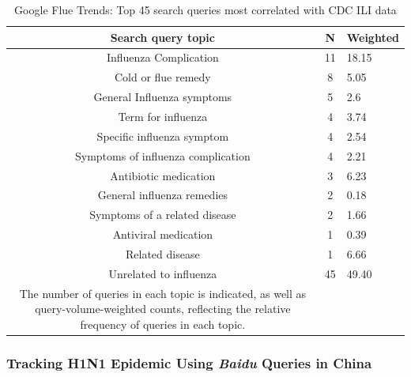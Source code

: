 \documentclass[sigconf]{acmart}
\begin{document}
\begin{table}
  \caption{Google Flue Trends: Top 45 search queries most correlated with CDC ILI data \cite{ginsburg09}}
  \label{tab:columns}
  \begin{tabular}{ccl}
    \toprule
     Search query topic& N& Weighted\\
    \midrule
     Influenza Complication& 11& 18.15\\
     Cold or flue remedy& 8& 5.05\\
     General Influenza symptoms& 5& 2.6\\
     Term for influenza& 4& 3.74\\
     Specific influenza symptom& 4& 2.54\\
     Symptoms of influenza complication& 4& 2.21\\
     Antibiotic medication& 3& 6.23\\
     General influenza remedies& 2& 0.18\\
     Symptoms of a related disease& 2& 1.66\\
     Antiviral medication& 1& 0.39\\
     Related disease& 1& 6.66\\
     Unrelated to influenza& 45& 49.40\\
    \midrule
     The number of queries in each topic is indicated, as well as query-volume-weighted counts, 
 reflecting the relative frequency of queries in each topic.\\ 
  \bottomrule
  \end{tabular}
\end{table}


\subsubsection{Tracking H1N1 Epidemic Using {\itshape Baidu} Queries in China}
\end{document}
